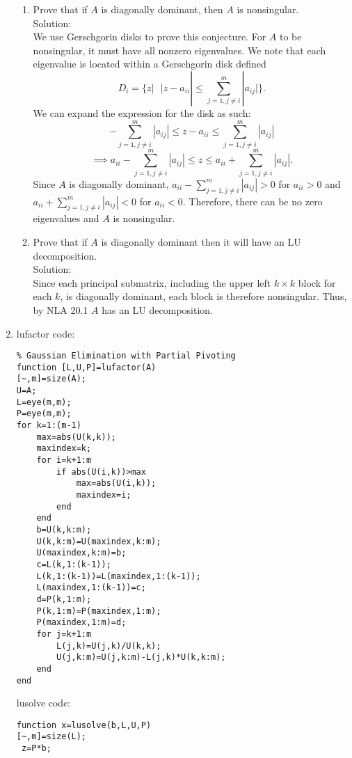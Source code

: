 \documentclass[12pt]{article}
\numberwithin{equation}{section}
\begin{document}
\begin{enumerate}
\begin{enumerate}
\item Prove that if $A$ is diagonally dominant, then $A$ is nonsingular.\\

Solution:\\

We use Gerschgorin disks to prove this conjecture. For $A$ to be nonsingular, it must have all nonzero eigenvalues. We note that each eigenvalue is located within a Gerschgorin disk defined
$$D_i=\{z|\text{  }|z-a_{ii}|\leq \sum_{j=1,j\neq i}^m|a_{ij}|\}.$$
We can expand the expression for the disk as such:
$$-\sum_{j=1,j\neq i}^m|a_{ij}|\leq z-a_{ii}\leq \sum_{j=1,j\neq i}^m|a_{ij}|$$
$$\implies a_{ii}-\sum_{j=1,j\neq i}^m|a_{ij}|\leq z\leq a_{ii}+\sum_{j=1,j\neq i}^m|a_{ij}|.$$
Since $A$ is diagonally dominant, $a_{ii}-\sum_{j=1,j\neq i}^m|a_{ij}|>0$ for $a_{ii}>0$ and $a_{ii}+\sum_{j=1,j\neq i}^m|a_{ij}|<0$ for $a_{ii}<0$. Therefore, there can be no zero eigenvalues and $A$ is nonsingular.\\


\item Prove that if $A$ is diagonally dominant then it will have an LU decomposition.\\

Solution:\\

Since each principal submatrix, including the upper left $k\times k$ block for each $k$, is diagonally dominant, each block is therefore nonsingular. Thus, by NLA 20.1 $A$ has an LU decomposition.
\end{enumerate}
\item lufactor code:
\begin{lstlisting}
% Gaussian Elimination with Partial Pivoting
function [L,U,P]=lufactor(A)
[~,m]=size(A);
U=A;
L=eye(m,m);
P=eye(m,m);
for k=1:(m-1)
    max=abs(U(k,k));
    maxindex=k;
    for i=k+1:m
        if abs(U(i,k))>max
            max=abs(U(i,k));
            maxindex=i;
        end
    end
    b=U(k,k:m);
    U(k,k:m)=U(maxindex,k:m);
    U(maxindex,k:m)=b;
    c=L(k,1:(k-1));
    L(k,1:(k-1))=L(maxindex,1:(k-1));
    L(maxindex,1:(k-1))=c;
    d=P(k,1:m);
    P(k,1:m)=P(maxindex,1:m);
    P(maxindex,1:m)=d;
    for j=k+1:m
        L(j,k)=U(j,k)/U(k,k);
        U(j,k:m)=U(j,k:m)-L(j,k)*U(k,k:m);
    end
end
\end{lstlisting}

lusolve code:
\begin{lstlisting}
function x=lusolve(b,L,U,P)
[~,m]=size(L);
 z=P*b;



\end{lstlisting}
\end{enumerate}
\end{document}
